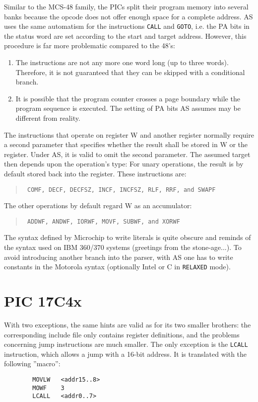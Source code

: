 \documentclass[12pt,twoside]{report}
\newcommand{\tty}[1]{{\tt #1}}
\newcommand{\asname}{{AS}}
\begin{document}
Similar to the MCS-48 family, the PICs split their program memory
into several banks because the opcode does not offer enough space for
a complete address.  \asname{} uses the same automatism for the instructions
\tty{CALL} and \tty{GOTO}, i.e. the PA bits in the status word are set according
to the start and target address.  However, this procedure is far more
problematic compared to the 48's:
\begin{enumerate}
\item{The instructions are not any more one word long (up to three
      words).  Therefore, it is not guaranteed that they can be
      skipped with a conditional branch.}
\item{It is possible that the program counter crosses a page boundary
      while the program sequence is executed.  The setting of PA bits
      \asname{} assumes may be different from reality.}
\end{enumerate}
The instructions that operate on register W and another register
normally require a second parameter that specifies whether the result
shall be stored in W or the register.  Under \asname{}, it is valid to omit
the second parameter.  The assumed target then depends upon the
operation's type: For unary operations, the result is by default
stored back into the register.  These instructions are:
\begin{quote}{\tt
    COMF, DECF, DECFSZ, INCF, INCFSZ, RLF, RRF, and SWAPF
}\end{quote}
The other operations by default regard W as an accumulator:
\begin{quote}{\tt
    ADDWF, ANDWF, IORWF, MOVF, SUBWF, and XORWF
}\end{quote}
The syntax defined by Microchip to write literals is quite obscure
and reminds of the syntax used on IBM 360/370 systems (greetings from
the stone-age...).  To avoid introducing another branch into the
parser, with \asname{} one has to write constants in the Motorola syntax
(optionally Intel or C in \tty{RELAXED} mode).


\section{PIC 17C4x}

With two exceptions, the same hints are valid as for its two smaller
brothers: the corresponding include file only contains register
definitions, and the problems concerning jump instructions are much
smaller.  The only exception is the \tty{LCALL} instruction, which allows a
jump with a 16-bit address.  It is translated with the following
''macro'':
\begin{verbatim}
        MOVLW   <addr15..8>
        MOWF    3
        LCALL   <addr0..7>
\end{verbatim}
\end{document}
